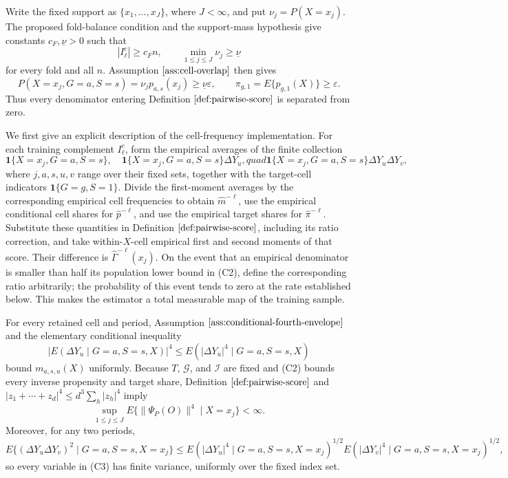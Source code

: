 Write the fixed support as \(\{x_1,\ldots,x_J\}\), where \(J<\infty\), and put \(\nu_j=P(X=x_j)\).  The proposed fold-balance condition and the support-mass hypothesis give constants \(c_F,\underline\nu>0\) such that
\[
 |I_\ell^c|\ge c_Fn,
 \qquad
 \min_{1\le j\le J}\nu_j\ge\underline\nu
 \tag{C1}
\]
for every fold and all \(n\).  Assumption \(\ref{ass:cell-overlap}\) then gives
\[
 P(X=x_j,G=a,S=s)=\nu_jp_{a,s}(x_j)
 \ge \underline\nu\varepsilon,
 \qquad
 \pi_{g,1}=E\{p_{g,1}(X)\}\ge\varepsilon.
 \tag{C2}
\]
Thus every denominator entering Definition \(\ref{def:pairwise-score}\) is separated from zero.

We first give an explicit description of the cell-frequency implementation.  For each training complement \(I_\ell^c\), form the empirical averages of the finite collection
\[
 \mathbf 1\{X=x_j,G=a,S=s\},\quad
 \mathbf 1\{X=x_j,G=a,S=s\}\Delta Y_u,quad
 \mathbf 1\{X=x_j,G=a,S=s\}\Delta Y_u\Delta Y_v,
 \tag{C3}
\]
where \(j,a,s,u,v\) range over their fixed sets, together with the target-cell indicators \(\mathbf 1\{G=g,S=1\}\).  Divide the first-moment averages by the corresponding empirical cell frequencies to obtain \(\widehat m^{-\ell}\), use the empirical conditional cell shares for \(\widehat p^{-\ell}\), and use the empirical target shares for \(\widehat\pi^{-\ell}\).  Substitute these quantities in Definition \(\ref{def:pairwise-score}\), including its ratio correction, and take within-\(X\)-cell empirical first and second moments of that score.  Their difference is \(\widehat\Gamma^{-\ell}(x_j)\).  On the event that an empirical denominator is smaller than half its population lower bound in (C2), define the corresponding ratio arbitrarily; the probability of this event tends to zero at the rate established below.  This makes the estimator a total measurable map of the training sample.

For every retained cell and period, Assumption \(\ref{ass:conditional-fourth-envelope}\) and the elementary conditional inequality
\[
 |E(\Delta Y_u\mid G=a,S=s,X)|^4
 \le E(|\Delta Y_u|^4\mid G=a,S=s,X)
 \tag{C4}
\]
bound \(m_{a,s,u}(X)\) uniformly.  Because \(T\), \(\mathcal G\), and \(\mathcal I\) are fixed and (C2) bounds every inverse propensity and target share, Definition \(\ref{def:pairwise-score}\) and \(|z_1+\cdots+z_d|^4\le d^3\sum_h|z_h|^4\) imply
\[
 \sup_{1\le j\le J}E\{\|\Psi_P(O)\|^4\mid X=x_j\}<\infty.
 \tag{C5}
\]
Moreover, for any two periods,
\[
 E\{(\Delta Y_u\Delta Y_v)^2\mid G=a,S=s,X=x_j\}
 \le
 E(|\Delta Y_u|^4\mid G=a,S=s,X=x_j)^{1/2}
 E(|\Delta Y_v|^4\mid G=a,S=s,X=x_j)^{1/2},
 \tag{C6}
\]
so every variable in (C3) has finite variance, uniformly over the fixed index set.

